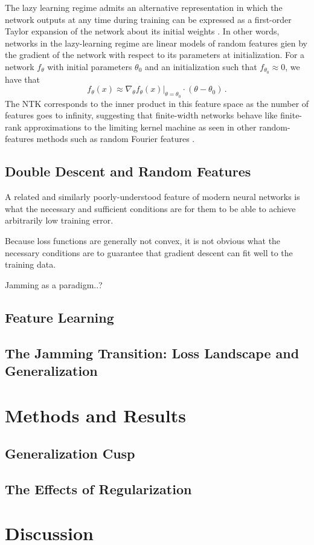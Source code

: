 \documentclass[a4paper, 12pt]{article}
\begin{document}
The lazy learning regime admits an alternative representation in which the network outputs at any time during training can be expressed as a first-order Taylor expansion of the network about its initial weights \cite{leeWideNeuralNetworks2019}. In other words, networks in the lazy-learning regime are linear models of random features gien by the gradient of the network with respect to its parameters at initialization. For a network $f_\theta$ with initial parameters $\theta_0$ and an initialization such that $f_{\theta_0} \approx 0$, we have that
\begin{equation}
    f_\theta(x) \approx \nabla_\theta \left.f_\theta(x)\right|_{\theta=\theta_0} \cdot (\theta - \theta_0)\,.
\end{equation}
The NTK corresponds to the inner product in this feature space as the number of features goes to infinity, suggesting that finite-width networks behave like finite-rank approximations to the limiting kernel machine as seen in other random-features methods such as random Fourier features \cite{rahimiRandomFeaturesLargeScalea}.

\subsection{Double Descent and Random Features}






A related and similarly poorly-understood feature of modern neural networks is what the necessary and sufficient conditions are for them to be able to achieve arbitrarily low training error. 

Because loss functions are generally not convex, it is not obvious what the necessary conditions are to guarantee that gradient descent can fit well to the training data. 


Jamming as a paradigm..?

\subsection{Feature Learning}

\subsection{The Jamming Transition: Loss Landscape and Generalization}


\section{Methods and Results}

\subsection{Generalization Cusp}
\subsection{The Effects of Regularization}

\section{Discussion}

\printbibliography
\end{document}
